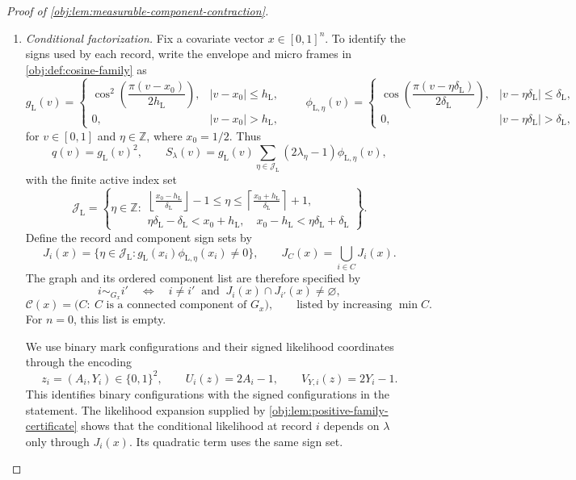\begin{proof}[Proof of \cref{obj:lem:measurable-component-contraction}]
\begin{enumerate}
\item \textit{Conditional factorization.}
Fix a covariate vector \(x\in[0,1]^n\). To identify the signs used by each record, write the envelope and micro frames in \cref{obj:def:cosine-family} as
\[
g_{\mathrm L}(v)=
\begin{cases}
\cos^2\!\left(\dfrac{\pi(v-x_0)}{2h_{\mathrm L}}\right),
& |v-x_0|\le h_{\mathrm L},\\
0,& |v-x_0|>h_{\mathrm L},
\end{cases}
\qquad
\phi_{\mathrm L,\eta}(v)=
\begin{cases}
\cos\!\left(\dfrac{\pi(v-\eta\delta_{\mathrm L})}{2\delta_{\mathrm L}}\right),
& |v-\eta\delta_{\mathrm L}|\le\delta_{\mathrm L},\\
0,& |v-\eta\delta_{\mathrm L}|>\delta_{\mathrm L},
\end{cases}
\]
for \(v\in[0,1]\) and \(\eta\in\mathbb Z\), where \(x_0=1/2\). Thus
\[
q(v)=g_{\mathrm L}(v)^2,
\qquad
S_\lambda(v)=g_{\mathrm L}(v)
 \sum_{\eta\in\mathcal J_{\mathrm L}}(2\lambda_\eta-1)\phi_{\mathrm L,\eta}(v),
\]
with the finite active index set
\[
\mathcal J_{\mathrm L}
=
\left\{
\eta\in\mathbb Z:
\begin{array}{l}
\displaystyle
\left\lfloor\frac{x_0-h_{\mathrm L}}{\delta_{\mathrm L}}\right\rfloor-1
\le \eta\le
\left\lceil\frac{x_0+h_{\mathrm L}}{\delta_{\mathrm L}}\right\rceil+1,\\
\eta\delta_{\mathrm L}-\delta_{\mathrm L}<x_0+h_{\mathrm L},
\quad
x_0-h_{\mathrm L}<\eta\delta_{\mathrm L}+\delta_{\mathrm L}
\end{array}
\right\}.
\]
Define the record and component sign sets by
\[
J_i(x)=
 \{\eta\in\mathcal J_{\mathrm L}:
   g_{\mathrm L}(x_i)\phi_{\mathrm L,\eta}(x_i)\ne0\},
\qquad
J_C(x)=\bigcup_{i\in C}J_i(x).
\]
The graph and its ordered component list are therefore specified by
\[
i\sim_{G_x}i'
\quad\Longleftrightarrow\quad
i\ne i'\ \text{ and }\ J_i(x)\cap J_{i'}(x)\ne\varnothing,
\]
\[
\mathscr C(x)
=
\bigl(C:\ C\text{ is a connected component of }G_x\bigr),
\qquad
\text{listed by increasing }\min C.
\]
For \(n=0\), this list is empty.

We use binary mark configurations and their signed likelihood coordinates through the encoding
\[
z_i=(A_i,Y_i)\in\{0,1\}^2,
\qquad
U_i(z)=2A_i-1,
\qquad
V_{Y,i}(z)=2Y_i-1.
\]
This identifies binary configurations with the signed configurations in the statement. The likelihood expansion supplied by
\cref{obj:lem:positive-family-certificate} shows that the conditional likelihood at record \(i\) depends on \(\lambda\) only through \(J_i(x)\). Its quadratic term uses the same sign set.


\end{enumerate}
\end{proof}

